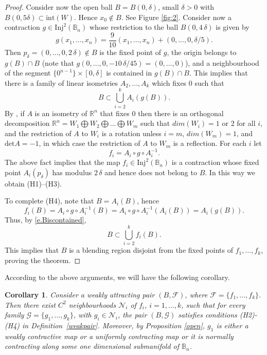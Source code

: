 \documentclass[11pt,reqno]{amsart}
\theoremstyle{plain}
\newtheorem{corollary}[theorem]{Corollary}
\newtheorem*{theorem A}{Theorem A}
\newtheorem*{theorem B}{Theorem B}
\newtheorem*{theorem C}{Theorem C}
\newtheorem*{theorem 1}{Theorem 1}
\newtheorem*{theorem 2}{Theorem 2}
\newtheorem*{theorem 3}{Theorem 3}
\numberwithin{equation}{section}
\begin{document}
\begin{proof}
Consider now the open ball $B=B(0,\delta)$, small $\delta >0$ with $B (0,5\delta)\subset \text{int}(W)$. Hence $x_0\not\in B$. See Figure \ref{fig:2}.
Consider now a contraction $g \in \mathrm{Inj}^2 (\mathbb{B}_n)$ whose restriction to the ball $B(0,4\,\delta)$ is given by
$$
g(x_1, \dots,x_n)= \frac{9}{10} (x_1,\dots, x_n) + (0,\dots,0, \delta/5).
$$
Then $p_\delta=(0, \dots, 0,2\,\delta)\not\in B$ is the fixed point of $g$,
the origin belongs to $g(B) \cap B$ (note that $g(0,\dots,0, -10\,\delta/45)=(0,\dots,0)$),
and a neighbourhood of the segment $\{0^{n-1}\} \times [0, \delta]$ is contained in $g(B) \cap B$. This implies that there is a family of linear isometries $A_2, \dots, A_k$ which fixes $0$ such that
\begin{equation}
\label{e.Biscontained}
B\subset \bigcup_{i=2}^k A_i(g(B)).
\end{equation}
By \cite{conradisometries}, if $A$ is an isometry of $\mathbb{R}^n$ that fixes 0 then there is an orthogonal decomposition $ \mathbb{R}^n = W_1 \bigoplus W_2 \bigoplus \dots \bigoplus W_m$ such that $dim(W_i) = 1$ or 2 for all $i$, and the restriction of $A$ to $W_i$ is a rotation unless $i = m$, $dim(W_m) = 1$, and $\text{det} A = -1$, in which case the restriction of $A$ to $W_m$ is a reflection.
For each $i$ let
$$
f_i = A_i \circ g \circ A_i^{-1}.
$$
The above fact implies that the map $f_i\in \mathrm{Inj}^2 (\mathbb{B}_n)$ is a contraction whose fixed point $A_i(p_\delta)$ has modulus $2\,\delta$ and hence does not belong to $B$.
In this way we obtain (H1)--(H3).

To complete (H4), note that $B=A_i (B)$, hence
$$
f_i(B) = A_i \circ g \circ A_i^{-1}(B) = A_i \circ g \circ A_i^{-1}(A_i(B)) = A_i (g (B)).
$$
Thus, by \eqref{e.Biscontained},
$$
B \subset \bigcup_{i=2}^k f_i(B).
$$
This implies that $B$ is a blending region disjoint from the fixed points of $f_1, \dots, f_k$, proving the theorem.
\end{proof}

According to the above arguments, we will have the following corollary.
\begin{corollary} \label{c.weakblending}
Consider a weakly attracting pair $(B,\mathcal{F})$, where $\mathcal{F}=\{f_1, \dots, f_k\}$.
Then there exist $C^2$ neighbourhoods $\mathcal{N}_i$ of $f_i$, $i=1, \dots, k$, such that for every family $\mathcal{G}=\{g_1, \dots, g_k\}$, with $g_i \in \mathcal{N}_i$, the pair $(B, \mathcal{G})$ satisfies conditions (H2)-(H4) in Definition~\ref{weakpair}.
Moreover, by Proposition \ref{open}, $g_1$ is either a weakly contractive map or a uniformly contracting map or it is normally contracting along some one dimensional submanifold of $\mathbb{B}_n$.
\end{corollary}
\end{document}
